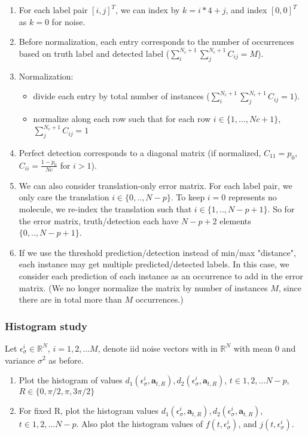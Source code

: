 \documentclass[11pt]{article}
\newcommand{\ba}{\boldsymbol{a}}
\begin{document}
\begin{itemize}
    \begin{enumerate}
        \item For each label pair $[i,j]^T$, we can index by $k=i*4+j$, and index $[0,0]^T$ as $k=0$ for noise.
        \item Before normalization, each entry corresponds to the number of occurrences based on truth label and detected label ($\sum_{i}^{N_c+1}\sum_{j}^{N_c+1} C_{ij} = M$).
        \item Normalization: 
        \begin{itemize}
            \item divide each entry by total number of instances ($\sum_{i}^{N_c+1}\sum_{j}^{N_c+1} C_{ij} = 1$).
            \item normalize along each row such that for each row $i \in \{1,...,Nc+1\}$, $\sum_{j}^{N_c+1} C_{ij} = 1$
        \end{itemize}
        \item Perfect detection corresponds to a diagonal matrix (if normalized, $C_{11}=p_0$, $C_{ii}=\frac{1-p_0}{Nc}$ for $i>1$).
        \item We can also consider translation-only error matrix. For each label pair, we only care the translation $i \in {\{0,..,N-p\}}$. To keep $i=0$ represents no molecule, we re-index the translation such that $i \in {\{1,..,N-p+1\}}$. So for the error matrix, truth/detection each have $N-p+2$ elements ${\{0,..,N-p+1\}}$.
        \item If we use the threshold prediction/detection instead of min/max "distance", each instance may get multiple predicted/detected labels. In this case, we consider each prediction of each instance as an occurrence to add in the error matrix. (We no longer normalize the matrix by number of instances $M$, since there are in total more than $M$ occurrences.)
        
    \end{enumerate}
    
\end{itemize}

\subsubsection{Histogram study}
Let $\epsilon_{\sigma}^{i}  \in \mathbb{R}^{N}$, $i=1,2,\ldots M$, denote iid noise vectors with in $\mathbb{R}^{N}$ with mean $0$ and variance $\sigma^2$ as before. 

\begin{enumerate}
\item Plot the histogram of values $d_{1}(\epsilon_{\sigma}^i, \ba_{t,R}), d_{2}(\epsilon_{\sigma}^i, \ba_{t,R})$, $t\in 1,2,\ldots N-p$, $R \in \{ 0,\pi/2, \pi, 3\pi/2 \}$
\item For fixed R, plot the histogram values $d_{1}(\epsilon_{\sigma}^i, \ba_{t,R}), d_{2}(\epsilon_{\sigma}^i, \ba_{t,R})$, $t\in 1,2,\ldots N-p$. Also plot the histogram values of $f(t,\epsilon_{\sigma}^i)$, and $j(t,\epsilon_{\sigma}^i)$.
\end{enumerate}
\end{document}
